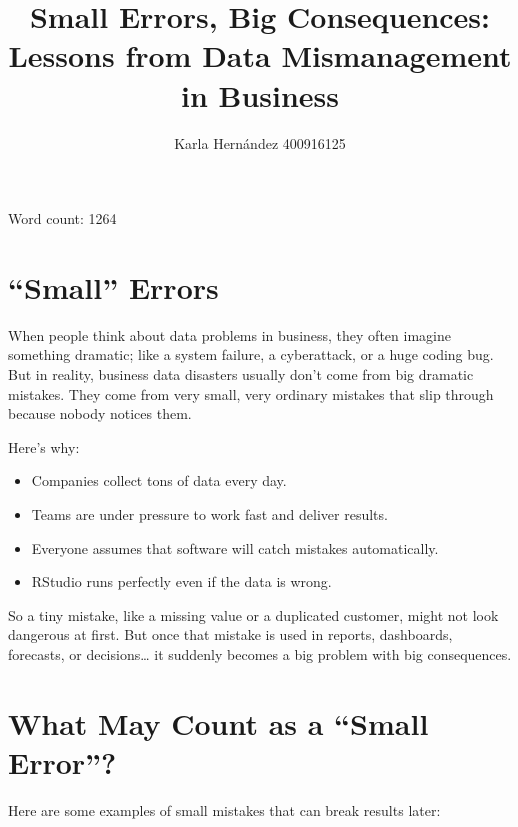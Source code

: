 \documentclass[
  stu,
  floatsintext,
  longtable,
  a4paper,
  nolmodern,
  notxfonts,
  notimes,
  colorlinks=true,linkcolor=blue,citecolor=blue,urlcolor=blue]{apa7}
\title{Small Errors, Big Consequences: Lessons from Data Mismanagement
in Business}
\author{Karla Hernández 400916125}
\affiliation{
{Fresenius University of Applied Science}}
\providecommand{\tightlist}{%
  \setlength{\itemsep}{0pt}\setlength{\parskip}{0pt}}
\begin{document}
\maketitle



\setcounter{secnumdepth}{3}

\setlength\LTleft{0pt}




Word count: 1264

\section{``Small'' Errors}\label{small-errors}

When people think about data problems in business, they often imagine
something dramatic; like a system failure, a cyberattack, or a huge
coding bug. But in reality, business data disasters usually don't come
from big dramatic mistakes. They come from very small, very ordinary
mistakes that slip through because nobody notices them.

Here's why:

\begin{itemize}
\tightlist
\item
  Companies collect tons of data every day.
\item
  Teams are under pressure to work fast and deliver results.
\item
  Everyone assumes that software will catch mistakes automatically.
\item
  RStudio runs perfectly even if the data is wrong.
\end{itemize}

So a tiny mistake, like a missing value or a duplicated customer, might
not look dangerous at first. But once that mistake is used in reports,
dashboards, forecasts, or decisions\ldots{} it suddenly becomes a big
problem with big consequences.

\section{What May Count as a ``Small
Error''?}\label{what-may-count-as-a-small-error}

Here are some examples of small mistakes that can break results later:
\end{document}
